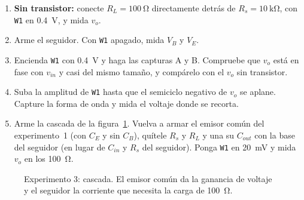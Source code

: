 \documentclass[11pt,a4paper]{article}
\begin{document}
\begin{enumerate}[label=\alph*), ref=\alph*, leftmargin=*, itemsep=3pt]
  \item \textbf{Sin transistor:} conecte $R_L = \qty{100}{\ohm}$ directamente detrás de
        $R_s = \qty{10}{\kilo\ohm}$, con \texttt{W1} en \qty{0.4}{\volt}, y mida $v_o$.
  \item Arme el seguidor. Con \texttt{W1} apagado, mida $V_B$ y $V_E$.
  \item Encienda \texttt{W1} con \qty{0.4}{\volt} y haga las capturas A y B. Compruebe que
        $v_o$ está en fase con $v_{in}$ y casi del mismo tamaño, y compárelo con el $v_o$ sin
        transistor.
  \item \label{paso:recorte}Suba la amplitud de \texttt{W1} hasta que el semiciclo negativo de
        $v_o$ se aplane. Capture la forma de onda y mida el voltaje donde se recorta.
  \item \label{paso:cascada}Arme la cascada de la figura~\ref{fig:cascada}. Vuelva a armar el
        emisor común del experimento~1 (con $C_E$ y sin $C_B$), quítele $R_s$ y $R_L$ y una su
        $C_{out}$ con la base del seguidor
        (en lugar de $C_{in}$ y $R_s$ del seguidor). Ponga \texttt{W1} en
        \qty{20}{\milli\volt} y mida $v_o$ en los \qty{100}{\ohm}.
\end{enumerate}

\begin{figure}[H]
  \centering
  \caption{Experimento 3: cascada. El emisor común da la ganancia de voltaje y el seguidor la
           corriente que necesita la carga de \qty{100}{\ohm}.}
  \label{fig:cascada}
\end{figure}
\end{document}
